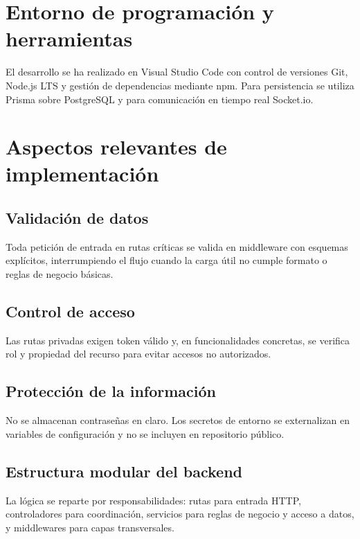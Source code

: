 \documentclass[12pt, a4paper]{report}
\begin{document}
\section{Entorno de programación y herramientas}

El desarrollo se ha realizado en Visual Studio Code con control de versiones Git, Node.js LTS y
gestión de dependencias mediante npm. Para persistencia se utiliza Prisma sobre PostgreSQL y para
comunicación en tiempo real Socket.io.

\section{Aspectos relevantes de implementación}

\subsection{Validación de datos}

Toda petición de entrada en rutas críticas se valida en middleware con esquemas explícitos,
interrumpiendo el flujo cuando la carga útil no cumple formato o reglas de negocio básicas.

\subsection{Control de acceso}

Las rutas privadas exigen token válido y, en funcionalidades concretas, se verifica rol y propiedad del
recurso para evitar accesos no autorizados.

\subsection{Protección de la información}

No se almacenan contraseñas en claro. Los secretos de entorno se externalizan en variables de
configuración y no se incluyen en repositorio público.

\subsection{Estructura modular del backend}

La lógica se reparte por responsabilidades: rutas para entrada HTTP, controladores para coordinación,
servicios para reglas de negocio y acceso a datos, y middlewares para capas transversales.

\end{document}
